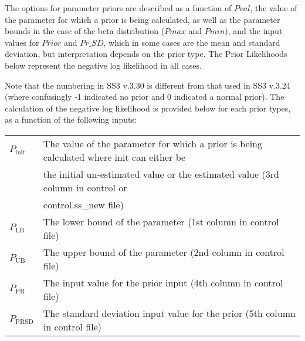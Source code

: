 The options for parameter priors are described as a function of $Pval$, the value of the parameter for which a prior is being calculated, as well as the parameter bounds in the case of the beta distribution ($Pmax$ and $Pmin$), and the input values for $Prior$ and $Pr\_SD$, which in some cases are the mean and standard deviation, but interpretation depends on the prior type. The Prior Likelihoods below represent the negative log likelihood in all cases.

Note that the numbering in SS3 v.3.30 is different from that used in SS3 v.3.24 (where confusingly -1 indicated no prior and 0 indicated a normal prior). The calculation of the negative log likelihood is provided below for each prior types, as a function of the following inputs:

\begin{tabular}{ll}
	$P_\text{init}$ & The value of the parameter for which a prior is being calculated where init can either be\\
	                & the initial un-estimated value or the estimated value (3rd column in control or \\
	                & control.ss\_new file)       \\
	$P_\text{LB}$   & The lower bound of the parameter (1st column in control file)     \\
	$P_\text{UB}$   & The upper bound of the parameter (2nd column in control file)     \\
	$P_\text{PR}$   & The input value for the prior input (4th column in control file)  \\
	$P_\text{PRSD}$ & The standard deviation input value for the prior (5th column in control file) \\
\end{tabular}

